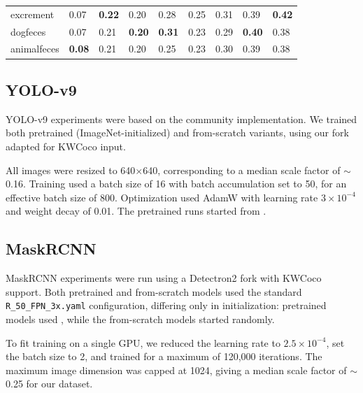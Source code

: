\begin{table}[t]
\begin{tabular}{lllllllll}
 excrement   & 0.07                 & \textbf{0.22}         & 0.20                 & 0.28                  & 0.25                 & 0.31                  & 0.39                 & \textbf{0.42}         \\
 dogfeces    & 0.07                 & 0.21                  & \textbf{0.20}        & \textbf{0.31}         & 0.23                 & 0.29                  & \textbf{0.40}        & 0.38                  \\
 animalfeces & \textbf{0.08}        & 0.21                  & 0.20                 & 0.25                  & 0.23                 & 0.30                  & 0.39                 & 0.38                  \\
\bottomrule
\end{tabular}
\ifwacv \CaptionPrompt \fi
\end{table}


\subsection{YOLO-v9}

YOLO-v9 experiments were based on the community  implementation.
We trained both pretrained (ImageNet-initialized) and from-scratch variants, using our fork adapted for
  KWCoco input.

All images were resized to 640$\times$640, corresponding to a median scale factor of $\sim$0.16.
Training used a batch size of 16 with batch accumulation set to 50, for an effective batch size of 800.
Optimization used AdamW with learning rate $3\times10^{-4}$ and weight decay of 0.01.
The pretrained runs started from \YOLOPretrained{}.


\subsection{MaskRCNN}

MaskRCNN experiments were run using a Detectron2 fork with KWCoco support.
Both pretrained and from-scratch models used the standard \texttt{R\_50\_FPN\_3x.yaml} configuration,
  differing only in initialization:
pretrained models used \MaskRCNNPretrained{}, while the from-scratch models started randomly.

To fit training on a single GPU, we reduced the learning rate to $2.5\times10^{-4}$, set the batch size to
  2, and trained for a maximum of 120{,}000 iterations.
The maximum image dimension was capped at 1024, giving a median scale factor of $\sim$0.25 for our
  dataset.


